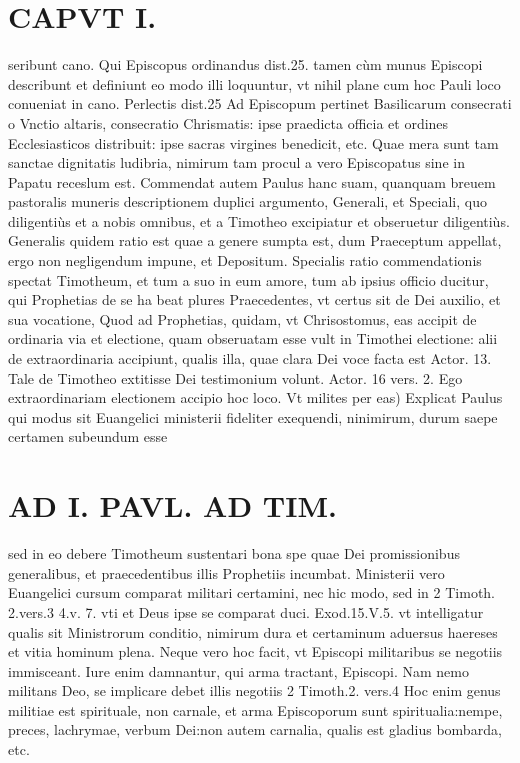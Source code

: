 \documentclass{article}
\begin{document}
\begin{pages}
\section*{CAPVT I. }
\marginpar{[ p.35 ]}\pstart seribunt cano. Qui Episcopus ordinandus dist.25. tamen cùm munus Episcopi describunt et definiunt eo modo illi loquuntur, vt nihil plane cum hoc Pauli loco conueniat in cano. Perlectis dist.25 Ad Episcopum pertinet Basilicarum consecrati o Vnctio altaris, consecratio Chrismatis: ipse praedicta officia et ordines Ecclesiasticos distribuit: ipse sacras virgines benedicit, etc. Quae mera sunt tam sanctae dignitatis ludibria, nimirum tam procul a vero Episcopatus sine in Papatu receslum est.  \pend\pstart Commendat autem Paulus hanc suam, quanquam breuem pastoralis muneris descriptionem duplici argumento, Generali, et Speciali, quo diligentiùs et a nobis omnibus, et a Timotheo excipiatur et obseruetur diligentiùs. Generalis quidem ratio est quae a genere sumpta est, dum Praeceptum appellat, ergo non negligendum impune, et Depositum. Specialis ratio commendationis spectat Timotheum, et tum a suo in eum amore, tum ab ipsius officio ducitur, qui Prophetias de se ha beat plures Praecedentes, vt certus sit de Dei auxilio, et sua vocatione, Quod ad Prophetias, quidam, vt Chrisostomus, eas accipit de ordinaria via et electione, quam obseruatam esse vult in Timothei electione: alii de extraordinaria accipiunt, qualis illa, quae clara Dei voce facta est Actor. 13. Tale de Timotheo extitisse Dei testimonium volunt. Actor. 16 vers. 2. Ego extraordinariam electionem accipio hoc loco.  \pend\pstart Vt milites per eas) Explicat Paulus qui modus sit Euangelici ministerii fideliter exequendi, ninimirum, durum saepe certamen subeundum esse  \pend
\section*{AD I. PAVL. AD TIM. }
\marginpar{[ p.36 ]}\pstart sed in eo debere Timotheum sustentari bona spe quae Dei promissionibus generalibus, et praecedentibus illis Prophetiis incumbat. Ministerii vero Euangelici cursum comparat militari certamini, nec hic modo, sed in 2 Timoth. 2.vers.3 4.v. 7. vti et Deus ipse se comparat duci. Exod.15.V.5. vt intelligatur qualis sit Ministrorum conditio, nimirum dura et certaminum aduersus haereses et vitia hominum plena. Neque vero hoc facit, vt Episcopi militaribus se negotiis immisceant. Iure enim damnantur, qui arma tractant, Episcopi. Nam nemo militans Deo, se implicare debet illis negotiis 2 Timoth.2. vers.4 Hoc enim genus militiae est spirituale, non carnale, et arma Episcoporum sunt spiritualia:nempe, preces, lachrymae, verbum Dei:non autem carnalia, qualis est gladius bombarda, etc.  \pend
{}
{}

\end{pages}
\end{document}
